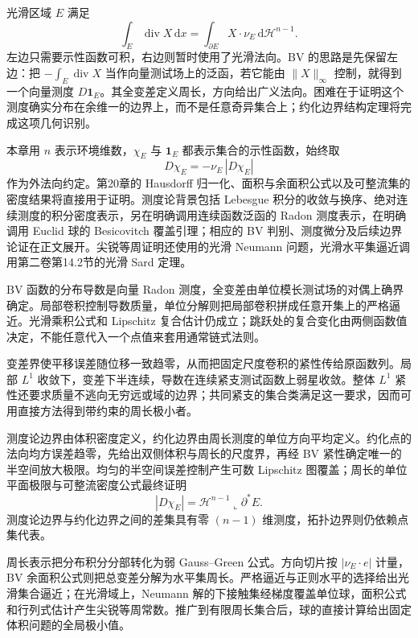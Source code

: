 \ProseParagraphBreak
光滑区域 \(E\) 满足
\[
	\int_E\operatorname{div}X\,\mathrm dx
	=\int_{\partial E}X\cdot\nu_E\,\mathrm d\mathcal H^{n-1}.
\]
左边只需要示性函数可积，右边则暂时使用了光滑法向。BV 的思路是先保留左边：把
\(-\int_E\operatorname{div}X\) 当作向量测试场上的泛函，若它能由 \(\|X\|_\infty\) 控制，就得到一个向量测度 \(D\mathbf1_E\)。其全变差定义周长，方向给出广义法向。困难在于证明这个测度确实分布在余维一的边界上，而不是任意奇异集合上；约化边界结构定理将完成这项几何识别。

\ProseParagraphBreak
本章用 \(n\) 表示环境维数，\(\chi_E\) 与 \(\mathbf1_E\) 都表示集合的示性函数，始终取
\[
	D\chi_E=-\nu_E\,|D\chi_E|
\]
作为外法向约定。第20章的 Hausdorff 归一化、面积与余面积公式以及可整流集的密度结果将直接用于证明。测度论背景包括 Lebesgue 积分的收敛与换序、绝对连续测度的积分密度表示，另在明确调用连续函数泛函的 Radon 测度表示，在明确调用 Euclid 球的 Besicovitch 覆盖引理；相应的 BV 判别、测度微分及后续边界论证在正文展开。尖锐等周证明还使用的光滑 Neumann 问题，光滑水平集逼近调用第二卷第14.2节的光滑 Sard 定理。







\begin{chaptersummary}
	BV 函数的分布导数是向量 Radon 测度，全变差由单位模长测试场的对偶上确界确定。局部卷积控制导数质量，单位分解则把局部卷积拼成任意开集上的严格逼近。光滑乘积公式和 Lipschitz 复合估计仍成立；跳跃处的复合变化由两侧函数值决定，不能任意代入一个点值来套用通常链式法则。

	\ProseParagraphBreak
	变差界使平移误差随位移一致趋零，从而把固定尺度卷积的紧性传给原函数列。局部 \(L^1\) 收敛下，变差下半连续，导数在连续紧支测试函数上弱星收敛。整体 \(L^1\) 紧性还要求质量不逃向无穷远或域的边界；共同紧支的集合类满足这一要求，因而可用直接方法得到带约束的周长极小者。

	\ProseParagraphBreak
	测度论边界由体积密度定义，约化边界由周长测度的单位方向平均定义。约化点的法向均方误差趋零，先给出双侧体积与周长的尺度界，再经 BV 紧性确定唯一的半空间放大极限。均匀的半空间误差控制产生可数 Lipschitz 图覆盖；周长的单位平面极限与可整流密度公式最终证明
	\[
		|D\chi_E|=\mathcal H^{n-1}\llcorner\partial^*E.
	\]
	测度论边界与约化边界之间的差集具有零 \((n-1)\) 维测度，拓扑边界则仍依赖点集代表。

	\ProseParagraphBreak
	周长表示把分布积分分部转化为弱 Gauss--Green 公式。方向切片按 \(|\nu_E\cdot e|\) 计量，BV 余面积公式则把总变差分解为水平集周长。严格逼近与正则水平的选择给出光滑集合逼近；在光滑域上，Neumann 解的下接触集经梯度覆盖单位球，面积公式和行列式估计产生尖锐等周常数。推广到有限周长集合后，球的直接计算给出固定体积问题的全局极小值。
\end{chaptersummary}

